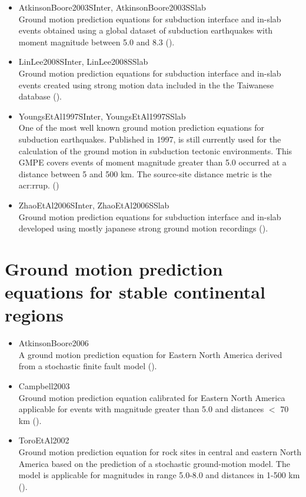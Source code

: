 \begin{itemize}

\item AtkinsonBoore2003SInter, AtkinsonBoore2003SSlab \hfill \\ Ground motion
prediction equations for subduction interface and in-slab events obtained
using a global dataset of subduction earthquakes with moment magnitude between
5.0 and 8.3 (\cite{atkinson2003}).

\item LinLee2008SInter, LinLee2008SSlab \hfill \\ Ground motion prediction
equations for subduction interface and in-slab events created using strong
motion data included in the the Taiwanese database (\cite{lin2008}).

\item YoungsEtAl1997SInter, YoungsEtAl1997SSlab \hfill \\ One of the most well
known ground motion prediction equations for subduction earthquakes. Published
in 1997, is still currently used for the calculation of the ground motion in
subduction tectonic environments. This GMPE covers events of moment magnitude
greater than 5.0 occurred at a distance between 5 and 500 km. The source-site
distance metric is the \gls{acr:rrup}. (\cite{youngs1997})

\item ZhaoEtAl2006SInter, ZhaoEtAl2006SSlab \hfill \\ Ground motion
prediction equations for subduction interface and in-slab developed
using mostly japanese strong ground motion recordings (\cite{zhao2006}).

\end{itemize}



\section[GMPEs for stable continental regions]{Ground motion prediction equations for stable continental regions}

\begin{itemize}

\item AtkinsonBoore2006 \hfill \\ A ground motion prediction equation for
Eastern North America derived from a stochastic finite fault model
(\cite{atkinson2006}).

\item Campbell2003 \hfill \\ Ground motion prediction equation calibrated for
Eastern North America applicable for events with magnitude greater than 5.0 and
distances $<$ 70 km (\cite{campbell2003}).

\item ToroEtAl2002 \hfill \\ Ground motion prediction equation for rock sites
in central and eastern North America based on the prediction of a stochastic
ground-motion model. The model is applicable for magnitudes in range 5.0-8.0 and
distances in 1-500 km (\cite{toro2002}).

\end{itemize}
